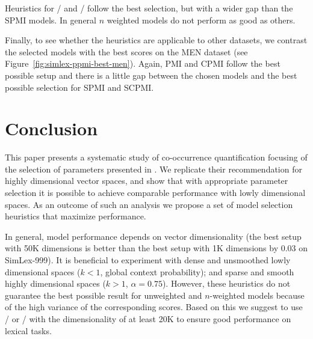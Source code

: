 \documentclass[11pt]{article}
\begin{document}
Heuristics for \logNCPMI/ and \CPMI/ follow the best selection, but with a wider gap than the SPMI models. In general $n$ weighted models do not perform as good as others.

Finally, to see whether the heuristics are applicable to other datasets, we contrast the selected models with the best scores on the MEN dataset (see Figure~\ref{fig:simlex-ppmi-best-men}). Again, PMI and CPMI follow the best possible setup and there is a little gap between the chosen models and the best possible selection for SPMI and SCPMI.

\section{Conclusion}
\label{sec:conclusion}

This paper presents a systematic study of co-occurrence quantification focusing of the selection of parameters presented in . We replicate their recommendation for highly dimensional vector spaces, and show that with appropriate parameter selection it is possible to achieve comparable performance with lowly dimensional spaces. As an outcome of such an analysis we propose a set of model selection heuristics that maximize performance.

In general, model performance depends on vector dimensionality (the best setup with 50K dimensions is better than the best setup with 1K dimensions by 0.03 on SimLex-999). It is beneficial to experiment with dense and unsmoothed lowly dimensional spaces ($k < 1$, global context probability); and sparse and smooth highly dimensional spaces ($k > 1$, $\alpha = 0.75$). However, these heuristics do not guarantee the best possible result for unweighted and $n$-weighted models because of the high variance of the corresponding scores. Based on this we suggest to use \logNSPMI/ or \logNSCPMI/ with the dimensionality of at least 20K to ensure good performance on lexical tasks.

%
% 

\balance

\end{document}
